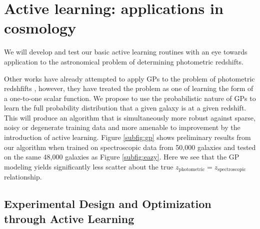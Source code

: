 \documentclass[useAMS,usenatbib,tightenlines,11pt,preprint]{aastex}
\begin{document}
\section{Active learning: applications in cosmology}


We will develop and test our basic active learning routines with an eye towards
application to the astronomical 
problem of determining photometric redshifts.





Other works have already attempted to apply GPs to the problem of
photometric redshfifts \cite{kaufman,bonfield}, however, they have treated the
problem as one of learning the form of a one-to-one scalar function.  We propose
to use the probabilistic nature of GPs to learn the full
probability distribution that a given galaxy is at a given redshift.  
This will produce an algorithm that is simultaneously more robust against
sparse, noisy or degenerate training data and more amenable to improvement 
by the introduction of
active learning.
Figure \ref{subfig:gp} shows preliminary results from our
algorithm when trained on spectroscopic data from 50,000 galaxies and tested
on the same 48,000 galaxies as Figure \ref{subfig:eazy}.  Here we see that
the GP modeling yields significantly less scatter about the true
$z_\text{photometric}=z_\text{spectroscopic}$ relationship.






\subsection{Experimental Design and Optimization through Active Learning}
\end{document}
